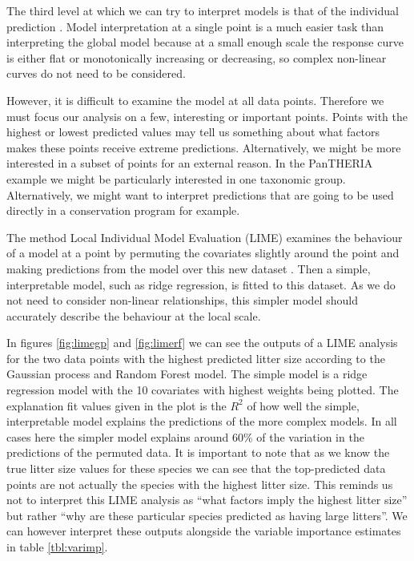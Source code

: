 \documentclass[12pt,]{article}
\begin{document}
The third level at which we can try to interpret models is that of the individual prediction \citep{lime, ribeiro2016should, lundberg2017unified, ribeiro2016nothing}.
Model interpretation at a single point is a much easier task than interpreting the global model because at a small enough scale the response curve is either flat or monotonically increasing or decreasing, so complex non-linear curves do not need to be considered.

However, it is difficult to examine the model at all data points.
Therefore we must focus our analysis on a few, interesting or important points.
Points with the highest or lowest predicted values may tell us something about what factors makes these points receive extreme predictions.
Alternatively, we might be more interested in a subset of points for an external reason.
In the PanTHERIA example we might be particularly interested in one taxonomic group.
Alternatively, we might want to interpret predictions that are going to be used directly in a conservation program for example.

The method Local Individual Model Evaluation (LIME) examines the behaviour of a model at a point by  permuting the covariates slightly around the point and making predictions from the model over this new dataset \citep{lime, ribeiro2016should, lundberg2017unified, ribeiro2016nothing}.
Then a simple, interpretable model, such as ridge regression, is fitted to this dataset.
As we do not need to consider non-linear relationships, this simpler model should accurately describe the behaviour at the local scale.

In figures \ref{fig:limegp} and \ref{fig:limerf} we can see the outputs of a LIME analysis for the two data points with the highest predicted litter size according to the Gaussian process and Random Forest model.
The simple model is a ridge regression model with the 10 covariates with highest weights being plotted.
The explanation fit values given in the plot is the $R^2$ of how well the simple, interpretable model explains the predictions of the more complex models.
In all cases here the simpler model explains around 60\% of the variation in the predictions of the permuted data.
It is important to note that as we know the true litter size values for these species we can see that the top-predicted data points are not actually the species with the highest litter size.
This reminds us not to interpret this LIME analysis as ``what factors imply the highest litter size'' but rather ``why are these particular species predicted as having large litters''.
We can however interpret these outputs alongside the variable importance estimates in table \ref{tbl:varimp}.
\end{document}
